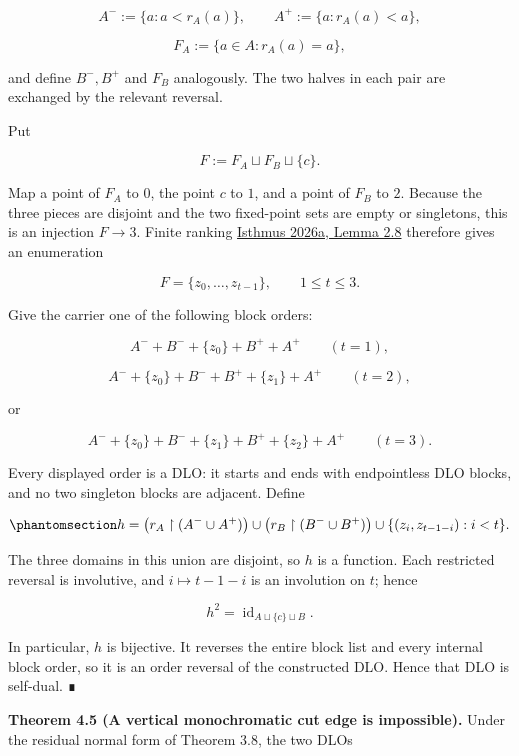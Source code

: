 \documentclass[
  english,
  11pt,
  reqno]{amsart}
\begin{document}
\[
A^-:=\{a:a<r_A(a)\},
\qquad
A^+:=\{a:r_A(a)<a\},
\]

\[
F_A:=\{a\in A:r_A(a)=a\},
\]

and define \(B^-,B^+\) and \(F_B\) analogously. The two halves in each
pair are exchanged by the relevant reversal.

Put

\[
F:=F_A\sqcup F_B\sqcup\{c\}.
\]

Map a point of \(F_A\) to \(0\), the point \(c\) to \(1\), and a point
of \(F_B\) to \(2\). Because the three pieces are disjoint and the two
fixed-point sets are empty or singletons, this is an injection
\(F\to3\). Finite ranking \hyperref[ref:isthmus2026a]{Isthmus 2026a,
Lemma 2.8} therefore gives an enumeration

\[
F=\{z_0,\ldots,z_{t-1}\},
\qquad
1\le t\le3.
\]

Give the carrier one of the following block orders:

\[
A^-+B^-+\{z_0\}+B^++A^+
\qquad(t=1),
\]

\[
A^-+\{z_0\}+B^-+B^++\{z_1\}+A^+
\qquad(t=2),
\]

or

\[
A^-+\{z_0\}+B^-+\{z_1\}+B^++\{z_2\}+A^+
\qquad(t=3).
\]

Every displayed order is a DLO: it starts and ends with endpointless DLO
blocks, and no two singleton blocks are adjacent. Define

\begin{equation}\protect\phantomsection\label{eq:selfdual-amalgamation-map}{
h
=
\bigl(r_A\restriction(A^-\cup A^+)\bigr)
\cup
\bigl(r_B\restriction(B^-\cup B^+)\bigr)
\cup
\{(z_i,z_{t-1-i}):i<t\}.
}\end{equation}

The three domains in this union are disjoint, so \(h\) is a function.
Each restricted reversal is involutive, and \(i\mapsto t-1-i\) is an
involution on \(t\); hence

\[
h^2=\operatorname{id}_{A\sqcup\{c\}\sqcup B}.
\]

In particular, \(h\) is bijective. It reverses the entire block list and
every internal block order, so it is an order reversal of the
constructed DLO. Hence that DLO is self-dual. ∎

\protect{}\label{thm:4-5-vertical-exclusion}

\textbf{Theorem 4.5 (A vertical monochromatic cut edge is impossible).}
Under the residual normal form of Theorem 3.8, the two DLOs
\end{document}
